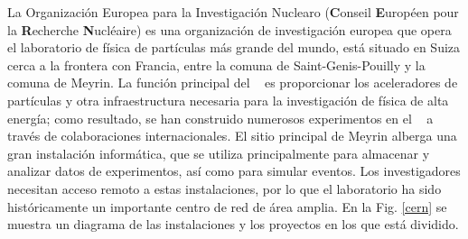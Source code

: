 La Organización Europea para la Investigación Nuclearo \CERN (\textbf{C}onseil \textbf{E}uropéen pour la \textbf{R}echerche \textbf{N}ucléaire) es una organización de investigación europea que opera el laboratorio de física de partículas más grande del mundo, está situado en Suiza cerca a la frontera con Francia, entre la comuna de Saint-Genis-Pouilly y la comuna de Meyrin. La función principal del \CERN ~ es proporcionar los aceleradores de partículas y otra infraestructura necesaria para la investigación de física de alta energía; como resultado, se han construido numerosos experimentos en el \CERN ~ a través de colaboraciones internacionales. El sitio principal de Meyrin alberga una gran instalación informática, que se utiliza principalmente para almacenar y analizar datos de experimentos, así como para simular eventos. Los investigadores necesitan acceso remoto a estas instalaciones, por lo que el laboratorio ha sido históricamente un importante centro de red de área amplia. En la Fig. \ref{cern} se muestra un diagrama de las instalaciones y los proyectos en los que está dividido. 


